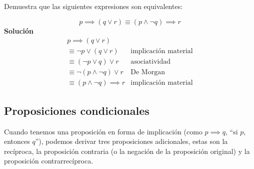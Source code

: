 \begin{fmd-example}
	Demuestra que las siguientes expresiones son equivalentes:
	
	\[
	p \implies \left( q \lor r \right) \equiv \left( p \land \neg q \right) \implies r
	\]
	\textbf{Solución}
	\[ \begin{array}{ll}
	p \implies \left( q \lor r \right) & \\
		\equiv \neg p \lor \left(q \lor r\right) & \mbox{implicación material}\\
		\equiv \left(\neg p \lor q \right) \lor r& \mbox{asociatividad}\\
		\equiv \neg \left(p \land \neg q\right) \lor r & \mbox{De Morgan}\\
		\equiv \left(p \land \neg q\right) \implies r & \mbox{implicación material}
	\end{array} \]
\end{fmd-example}

\subsection{Proposiciones condicionales}

Cuando tenemos una proposición en forma de implicación (como $p \implies q$,  ``si $p$, entonces $q$''), podemos derivar tres proposiciones adicionales, estas son la recíproca, la proposición contraria (o la negación de la proposición original) y la proposición contrarrecíproca.


